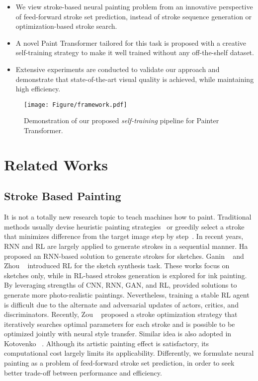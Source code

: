 \documentclass[10pt,twocolumn,letterpaper]{article}
\begin{document}
\begin{itemize}
    \item We view stroke-based neural painting problem from an innovative perspective of feed-forward stroke set prediction, instead of stroke sequence generation or optimization-based stroke search. 
    \item A novel Paint Transformer tailored for this task is proposed with a creative self-training strategy to make it well trained without any off-the-shelf dataset. 
    \item Extensive experiments are conducted to validate our approach and demonstrate that state-of-the-art visual quality is achieved, while maintaining high efficiency. 
\end{itemize}

\begin{figure*}
\begin{center}
\texttt{[image: Figure/framework.pdf]}
\end{center}
   \caption{Demonstration of our proposed \emph{self-training} pipeline for Painter Transformer.}
\label{fig:framework}
\vspace{-0.2cm}
\end{figure*}

\section{Related Works}
\subsection{Stroke Based Painting}
It is not a totally new research topic to teach machines how to paint.
Traditional methods usually devise heuristic painting strategies~\cite{hertzmann1998painterly} or greedily select a stroke that minimizes difference from the target image step by step~\cite{haeberli1990paint,litwinowicz1997processing}.
In recent years, RNN and RL are largely applied to generate strokes in a sequential manner.
Ha \etal~\cite{ha2017neural} proposed an RNN-based solution to generate strokes for sketches. 
Ganin \etal~\cite{ganin2018synthesizing} and Zhou \etal~\cite{zhou2018learning} introduced RL for the sketch synthesis task.
These works focus on sketches only, while in \cite{xie2013artist} RL-based strokes generation is explored for ink painting.
By leveraging strengths of CNN, RNN, GAN, and RL, \cite{huang2019learning} provided solutions to generate more photo-realistic paintings.
Nevertheless, training a stable RL agent is difficult due to the alternate and adversarial updates of actors, critics, and discriminators. 
Recently, Zou \etal~\cite{zou2020stylized} proposed a stroke optimization strategy that iteratively searches optimal parameters for each stroke and is possible to be optimized jointly with neural style transfer. 
Similar idea is also adopted in Kotovenko \etal~\cite{kotovenko_cvpr_2021}. 
Although its artistic painting effect is satisfactory, its computational cost largely limits its applicability.
Differently, we formulate neural painting as a problem of feed-forward stroke set prediction, in order to seek better trade-off between performance and efficiency.
\end{document}
